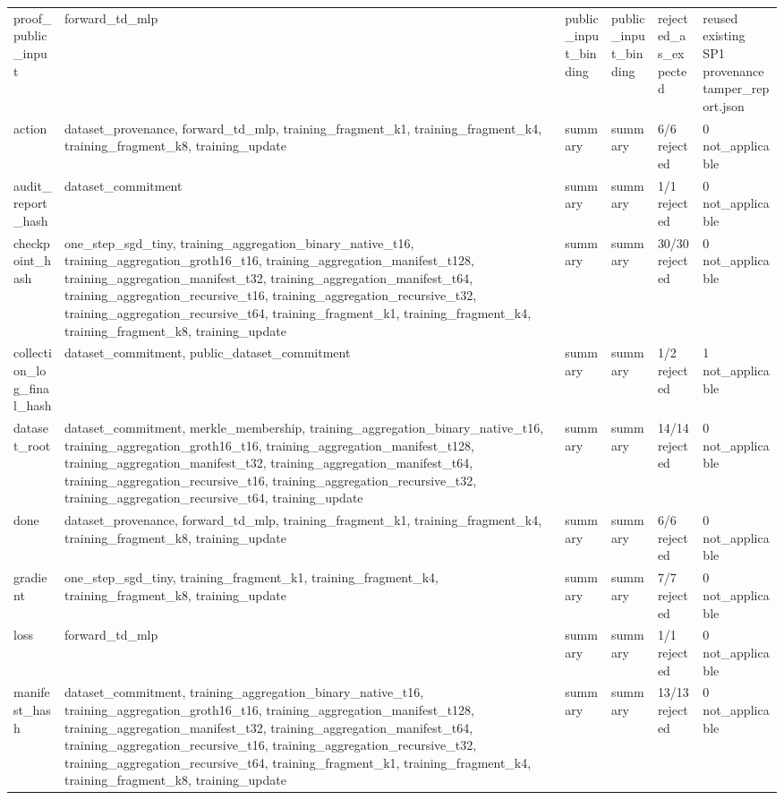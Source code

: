 \begin{table}[t]
\begin{tabular}{llllll}
proof\_public\_input & forward\_td\_mlp & public\_input\_binding & public\_input\_binding & rejected\_as\_expected & reused existing SP1 provenance tamper\_report.json \\
action & dataset\_provenance, forward\_td\_mlp, training\_fragment\_k1, training\_fragment\_k4, training\_fragment\_k8, training\_update & summary & summary & 6/6 rejected & 0 not\_applicable \\
audit\_report\_hash & dataset\_commitment & summary & summary & 1/1 rejected & 0 not\_applicable \\
checkpoint\_hash & one\_step\_sgd\_tiny, training\_aggregation\_binary\_native\_t16, training\_aggregation\_groth16\_t16, training\_aggregation\_manifest\_t128, training\_aggregation\_manifest\_t32, training\_aggregation\_manifest\_t64, training\_aggregation\_recursive\_t16, training\_aggregation\_recursive\_t32, training\_aggregation\_recursive\_t64, training\_fragment\_k1, training\_fragment\_k4, training\_fragment\_k8, training\_update & summary & summary & 30/30 rejected & 0 not\_applicable \\
collection\_log\_final\_hash & dataset\_commitment, public\_dataset\_commitment & summary & summary & 1/2 rejected & 1 not\_applicable \\
dataset\_root & dataset\_commitment, merkle\_membership, training\_aggregation\_binary\_native\_t16, training\_aggregation\_groth16\_t16, training\_aggregation\_manifest\_t128, training\_aggregation\_manifest\_t32, training\_aggregation\_manifest\_t64, training\_aggregation\_recursive\_t16, training\_aggregation\_recursive\_t32, training\_aggregation\_recursive\_t64, training\_update & summary & summary & 14/14 rejected & 0 not\_applicable \\
done & dataset\_provenance, forward\_td\_mlp, training\_fragment\_k1, training\_fragment\_k4, training\_fragment\_k8, training\_update & summary & summary & 6/6 rejected & 0 not\_applicable \\
gradient & one\_step\_sgd\_tiny, training\_fragment\_k1, training\_fragment\_k4, training\_fragment\_k8, training\_update & summary & summary & 7/7 rejected & 0 not\_applicable \\
loss & forward\_td\_mlp & summary & summary & 1/1 rejected & 0 not\_applicable \\
manifest\_hash & dataset\_commitment, training\_aggregation\_binary\_native\_t16, training\_aggregation\_groth16\_t16, training\_aggregation\_manifest\_t128, training\_aggregation\_manifest\_t32, training\_aggregation\_manifest\_t64, training\_aggregation\_recursive\_t16, training\_aggregation\_recursive\_t32, training\_aggregation\_recursive\_t64, training\_fragment\_k1, training\_fragment\_k4, training\_fragment\_k8, training\_update & summary & summary & 13/13 rejected & 0 not\_applicable \\

\end{tabular}
\end{table}
